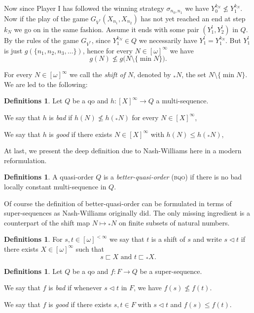 \documentclass{article}%
\theoremstyle{plain}
\theoremstyle{definition}
\newtheorem{definition}[theorem]{Definition}
\newtheorem{definition}[theorem]{Notation}
\newtheorem{definition}[theorem]{Notations}
\newtheorem{definition}[theorem]{Definitions}
\theoremstyle{remark}
\newcommand{\bqo}{\textsc{bqo}}
\newcommand{\GPowerQ}{G_{V^{*}}}
\newcommand{\segs} {\sqsubset}
\newcommand{\tri} {\mathrel{\lhd}}
\newcommand{\shift}[1]{{}_{*}#1}
\newcommand{\finSub}[1] {[#1]^{<\infty}}
\newcommand{\infSub}[1]{[#1]^{\infty}}
\newcommand{\I}{\mathrm{I}}
\begin{document}
Now since Player $\I$ has followed the winning strategy $\sigma_{n_{0},n_{1}}$ we have $Y^{k_{N}}_{0}\nleq Y^{k_{N}}_{1}$. Now if the play of the game $\GPowerQ (X_{n_{1}},X_{n_{2}})$ has not yet reached an end at step $k_{N}$ we go on in the same fashion. Assume it ends with some pair $(Y^{l}_{1},Y^{l}_{2})$ in $Q$. By the rules of the game $\GPowerQ $, since $Y_{1}^{k_{N}}\in Q$ we necessarily have $Y^{l}_{1}=Y^{k_{N}}_{1}$. But $Y^{l}_{1}$ is just $g(\{n_{1},n_{2},n_{3},\ldots\})$, hence for every $N\in\infSub{\omega}$ we have
\[
g(N)\nleq g\big(N\setminus \{\min N\}\big).
\]

For every $N\in\infSub{\omega}$ we call the \emph{shift of $N$}, denoted by $\shift{N}$, the set $N\setminus\{\min N\}$. We are led to the following:
\begin{definition}
Let $Q$ be a qo and $h:\infSub{X}\to Q$ a multi-sequence.
\begin{enumDefn}
\item We say that $h$ is \emph{bad} if $h(N)\nleq h(\shift{N})$ for every $N\in\infSub{X}$,
\item We say that $h$ is \emph{good} if there exists $N\in\infSub{X}$ with $h(N)\leq h(\shift{N})$,
\end{enumDefn}
\end{definition}


At last, we present the deep definition due to Nash-Williams here in a modern reformulation.

 \begin{definition}
A quasi-order $Q$ is a \emph{better-quasi-order} (\bqo{}) if there is no bad locally constant multi-sequence in $Q$.
 \end{definition}


Of course the definition of better-quasi-order can be formulated in terms of super-sequences as Nash-Williams originally did.
The only missing ingredient is a counterpart of the shift map $N\mapsto \shift{N}$ on finite subsets of natural numbers.

\begin{definition}
For $s,t\in\finSub{\omega}$ we say that $t$ is a shift of $s$ and write $s\tri t$ if there exists $X\in\infSub{\omega}$ such that 
\[s\segs X\mbox{ and }t\segs \shift{X}.\]
\end{definition}

\begin{definition} 
Let $Q$ be a qo and $f:F\to Q$ be a super-sequence.
\begin{enumDefn}
\item We say that $f$ is \emph{bad} if whenever $s\tri t$ in $F$, we have $f(s)\nleq f(t)$.
\item We say that $f$ is \emph{good} if there exists $s,t\in F$ with $s\tri t$ and $f(s)\leq f(t)$.
\end{enumDefn}
\end{definition}
\end{document}
